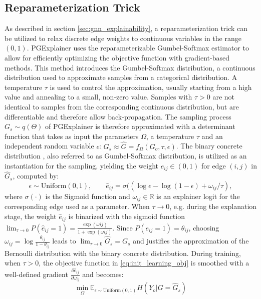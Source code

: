 \subsection{Reparameterization Trick}
\label{sec:Reparameterization_Trick}
As described in section \ref{sec:gnn_explainability}, a reparameterization trick can be utilized to relax discrete edge weights to continuous variables in the range $(0,1)$. PGExplainer uses the reparameterizable Gumbel-Softmax estimator \cite{jang2016categorical} to allow for efficiently optimizing the objective function with gradient-based methods. This method introduces the Gumbel-Softmax distribution, a continuous distribution used to approximate samples from a categorical distribution. A temperature $\tau$ is used to control the approximation, usually starting from a high value and annealing to a small, non-zero value. Samples with $\tau > 0$ are not identical to samples from the corresponding continuous distribution, but are differentiable and therefore allow back-propagation. The sampling process $G_s \sim q(\Theta)$ of PGExplainer is therefore approximated with a determinant function that takes as input the parameters $\Omega$, a temperature $\tau$ and an independent random variable $\epsilon$: $G_s \approx \hat{G}=f_\Omega(G_o,\tau,\epsilon)$. The binary concrete distribution \cite{maddison2016concrete}, also referred to as Gumbel-Softmax distribution, is utilized as an instantiation for the sampling, yielding the weight $\hat{e}_{ij} \in (0,1)$ for edge $(i,j)$ in $\hat{G}_s$, computed by:
\begin{equation}
    \label{eq:reparam_trick}
    \epsilon \sim \text{Uniform}(0,1), \qquad \hat{e}_{ij}=\sigma((\log \epsilon - \log(1-\epsilon)+\omega_{ij}/\tau),
\end{equation}
where $\sigma(\cdot)$ is the Sigmoid function and $\omega_{ij} \in \mathbb{R}$ is an explainer logit for the corresponding edge used as a parameter. When $\tau \rightarrow 0$, e.g. during the explanation stage, the weight $\hat{e}_{ij}$ is binarized with the sigmoid function $\lim_{\tau\rightarrow 0}P(\hat{e}_{ij} = 1) = \frac{\exp (\omega{ij})}{1+\exp (\omega{ij})}$. Since $P(e_{ij} = 1) = \theta_{ij}$, choosing $\omega_{ij} = \log\frac{\theta_{ij}}{1-\theta_{ij}}$ leads to $\lim_{\tau\rightarrow 0}\hat{G}_s = G_s$ and justifies the approximation of the Bernoulli distribution with the binary concrete distribution. During training, when $\tau > 0$, the objective function in \eqref{eq:init_learning_obj} is smoothed with a well-defined gradient $\frac{\partial\hat{e}_{ij}}{\partial\omega_{ij}}$ and becomes:
\begin{equation}
    \min_\Omega \mathbb{E}_{\epsilon \sim \text{Uniform}(0,1)}H(Y_o| G = \hat{G}_s)
\end{equation}

